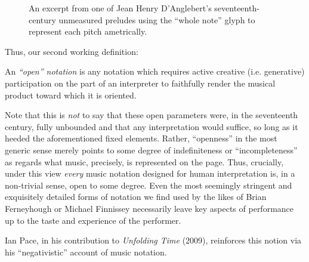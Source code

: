         \begin{figure}
            \centering
            \captionsetup{width=.5\linewidth}
            \caption[An excerpt from one of Jean Henry D'Anglebert's seventeenth-century unmeasured preludes using the ``whole note'' glyph to represent each pitch ametrically.]{An excerpt from one of Jean Henry D'Anglebert's seventeenth-century unmeasured preludes using the ``whole note'' glyph to represent each pitch ametrically.\footnotemark}
            \label{fig:nonmesure}
        \end{figure}

    Thus, our second working definition:

        \begin{smallquote}
        An \textit{``open'' notation} is any notation which requires active creative (i.e. generative) participation on the part of an interpreter to faithfully render the musical product toward which it is oriented.
        \end{smallquote}


    Note that this is \textit{not} to say that these open parameters were, in the seventeenth century, fully unbounded and that any interpretation would suffice, so long as it heeded the aforementioned fixed elements. Rather, ``openness'' in the most generic sense merely points to some degree of indefiniteness or ``incompleteness'' as regards what music, precisely, is represented on the page. Thus, crucially, under this view \textit{every} music notation designed for human interpretation is, in a non-trivial sense, open to some degree. Even the most seemingly stringent and exquisitely detailed forms of notation we find used by the likes of Brian Ferneyhough or Michael Finnissey necessarily leave key aspects of performance up to the taste and experience of the performer.
    
    Ian Pace, in his contribution to \textit{Unfolding Time} (2009), reinforces this notion via his ``negativistic'' account of music notation.   

